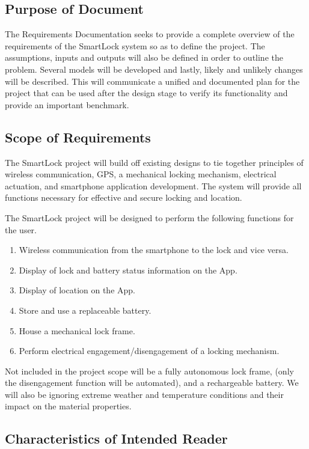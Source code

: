 \documentclass[12pt]{article}
\begin{document}
\subsection{Purpose of Document}

The Requirements Documentation seeks to provide a complete overview of the requirements of the SmartLock system so as to define the project. The assumptions, inputs and outputs will also be defined in order to outline the problem. Several models will be developed and lastly, likely and unlikely changes will be described. This will communicate a unified and documented plan for the project that can be used after the design stage to verify its functionality and provide an important benchmark. 

\subsection{Scope of Requirements} 

The SmartLock project will build off existing designs to tie together principles of wireless communication, GPS, a mechanical locking mechanism, electrical actuation, and smartphone application development. The system will provide all functions necessary for effective and secure locking and location.  

The SmartLock project will be designed to perform the following functions for the user.  

\begin{enumerate}
\item Wireless communication from the smartphone to the lock and vice versa. 
\item Display of lock and battery status information on the App. 
\item Display of location on the App. 
\item Store and use a replaceable battery. 
\item House a mechanical lock frame. 
\item Perform electrical engagement/disengagement of a locking mechanism. 
\end{enumerate}

Not included in the project scope will be a fully autonomous lock frame, (only the disengagement function will be automated), and a rechargeable battery. We will also be ignoring extreme weather and temperature conditions and their impact on the material properties.

\subsection{Characteristics of Intended Reader} \label{sec_IntendedReader}
\end{document}
